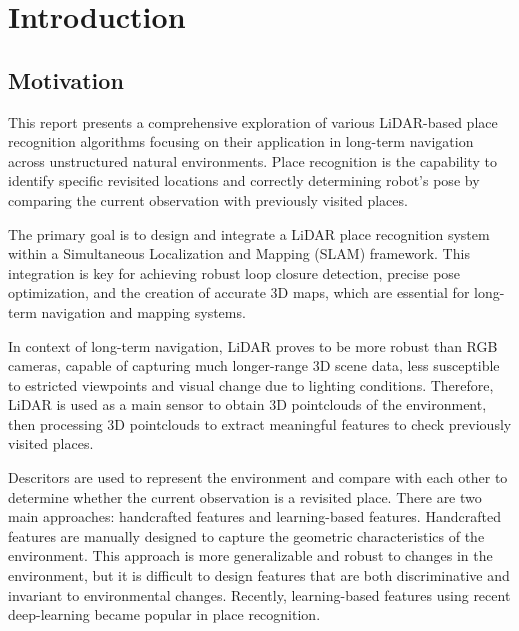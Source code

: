 \chapter{Introduction}
\label{chap:intro}


\section{Motivation}

This report presents a comprehensive exploration of various LiDAR-based place recognition algorithms focusing on their application in long-term navigation across unstructured natural environments. 
Place recognition is the capability to identify specific revisited locations and correctly determining robot's pose by comparing the current observation with previously visited places. 

The primary goal is to design and integrate a LiDAR place recognition system within a Simultaneous Localization and Mapping (SLAM) framework. 
This integration is key for achieving robust loop closure detection, precise pose optimization, and the creation of accurate 3D maps, which are essential for long-term navigation and mapping systems.

In context of long-term navigation, LiDAR proves to be more robust than RGB cameras, capable of capturing much longer-range 3D scene data,  less susceptible to estricted viewpoints and visual change due to lighting conditions.
Therefore, LiDAR is used as a main sensor to obtain 3D pointclouds of the environment, then processing 3D pointclouds to extract meaningful features to check previously visited places.

Descritors are used to represent the environment and compare with each other to determine whether the current observation is a revisited place.
There are two main approaches: handcrafted features and learning-based features.
Handcrafted features are manually designed to capture the geometric characteristics of the environment.
This approach is more generalizable and robust to changes in the environment, but it is difficult to design features that are both discriminative and invariant to environmental changes.
Recently, learning-based features using recent deep-learning became popular in place recognition.

